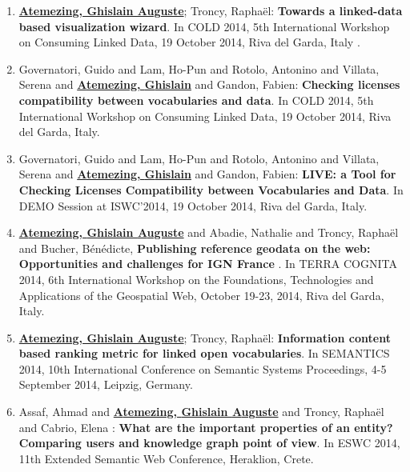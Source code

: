 \begin{enumerate}
\item \underline{\textbf{Atemezing, Ghislain Auguste}}; Troncy,  Rapha{\"e}l: \textbf{{T}owards a linked-data based visualization wizard}. In {COLD} 2014, 5th {I}nternational {W}orkshop on {C}onsuming {L}inked {D}ata, 19 {O}ctober 2014, {R}iva del {G}arda, {I}taly .

\item {G}overnatori, {G}uido and  {L}am, {H}o-{P}un and  {R}otolo, {A}ntonino and  {V}illata, {S}erena and  \underline{\textbf{{A}temezing, {G}hislain}} and  {G}andon, {F}abien: \textbf{{C}hecking licenses compatibility between vocabularies and data}. In {COLD} 2014, 5th {I}nternational {W}orkshop on {C}onsuming {L}inked {D}ata, 19 {O}ctober 2014, {R}iva del {G}arda, {I}taly.

\item {G}overnatori, {G}uido and  {L}am, {H}o-{P}un and  {R}otolo, {A}ntonino and  {V}illata, {S}erena and  \underline{\textbf{{A}temezing, {G}hislain}} and  {G}andon, {F}abien: \textbf{LIVE: a Tool for Checking Licenses Compatibility between Vocabularies and Data}. In {DEMO Session} at ISWC'2014, 19 {O}ctober 2014, {R}iva del {G}arda, {I}taly.

\item \underline{\textbf{{A}temezing, {G}hislain {A}uguste}} and  {A}badie, {N}athalie and  {T}roncy, {R}apha{\"e}l and  {B}ucher, {B}{\'e}n{\'e}dicte, \textbf{{P}ublishing reference geodata on the web: {O}pportunities and challenges for {IGN} {F}rance }. In {TERRA} {COGNITA} 2014, 6th {I}nternational {W}orkshop on the {F}oundations, {T}echnologies and {A}pplications of the {G}eospatial {W}eb, {O}ctober 19-23, 2014, {R}iva del {G}arda, {I}taly.

\item \underline{\textbf{Atemezing, Ghislain Auguste}}; Troncy,  Rapha{\"e}l: \textbf{{I}nformation content based ranking metric for linked open vocabularies}. In {SEMANTICS} 2014, 10th {I}nternational {C}onference on {S}emantic {S}ystems {P}roceedings, 4-5 {S}eptember 2014, {L}eipzig, {G}ermany.

\item {A}ssaf, {A}hmad and  \underline{\textbf{{A}temezing,  {G}hislain {A}uguste}} and  {T}roncy, {R}apha{\"e}l and  {C}abrio, {E}lena : \textbf{{W}hat are the important properties of an entity? {C}omparing users and knowledge graph point of view}. In {ESWC} 2014, 11th {E}xtended {S}emantic {W}eb {C}onference, {H}eraklion, {C}rete.


\end{enumerate}
